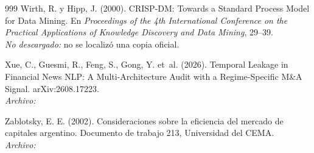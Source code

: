 \begin{thebibliography}{999}
Wirth, R. y Hipp, J. (2000). {CRISP-DM}: Towards a Standard Process Model for Data Mining. En \emph{Proceedings of the 4th International Conference on the Practical Applications of Knowledge Discovery and Data Mining}, 29--39.
\\\textit{No descargado:} no se localizó una copia oficial.

Xue, C., Guesmi, R., Feng, S., Gong, Y. et~al. (2026). Temporal Leakage in Financial News {NLP}: A Multi-Architecture Audit with a Regime-Specific {M\&A} Signal. arXiv:2608.17223.
\\\textit{Archivo:} 

Zablotsky, E. E. (2002). Consideraciones sobre la eficiencia del mercado de capitales argentino. Documento de trabajo 213, Universidad del CEMA.
\\\textit{Archivo:} 

\end{thebibliography}
